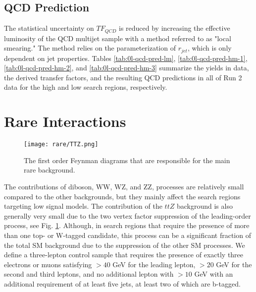 \subsection{QCD Prediction}\label{sec:QCDPred}

The statistical uncertainty on $TF_{QCD}$ is reduced by increasing the effective luminosity of the QCD multijet sample with a method referred to as "local smearing." The method relies on the parameterization of $r_{jet}$, which is only dependent on jet properties. Tables \ref{tab:0l-qcd-pred-lm}, \ref{tab:0l-qcd-pred-hm-1}, \ref{tab:0l-qcd-pred-hm-2}, and \ref{tab:0l-qcd-pred-hm-3} summarize the yields in data, the derived transfer factors, and the resulting QCD predictions in all \datalumi{} of Run 2 data for the high \dm{} and low \dm{} search regions, respectively. 






\section{Rare Interactions}
\label{subsec:rare}

\begin{figure}
	\begin{center}
  \texttt{[image: rare/TTZ.png]}
	\end{center}
	\caption[Diboson and $ttZ$ Feynman Diagrams]{The first order Feynman diagrams that are responsible for the main rare background.}
	\label{fig:rare-feynman-diagrams}
\end{figure}

The contributions of diboson, WW, WZ, and ZZ, processes are relatively small compared to the other backgrounds, but they mainly affect the search regions targeting low \dm{} signal models. The contribution of the $ttZ$ background is also generally very small due to the two vertex factor suppression of the leading-order process, see Fig. \ref{fig:rare-feynman-diagrams}. Although, in search regions that require the presence of more than one top- or W-tagged candidate, this process can be a significant fraction of the total SM background due to the suppression of the other SM processes. We define a three-lepton control sample that requires the presence of exactly three electrons or muons satisfying \pt$>40$ GeV for the leading lepton, \pt$>20$ GeV for the second and third leptons, and no additional lepton with \pt$>10$ GeV with an additional requirement of at least five jets, at least two of which are b-tagged. 

